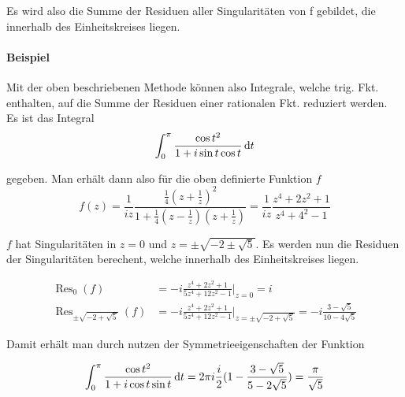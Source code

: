 Es wird also die Summe der Residuen aller Singularitäten von f gebildet, die innerhalb des Einheitskreises liegen.

\paragraph{Beispiel}
Mit der oben beschriebenen Methode können also Integrale, welche trig. Fkt. enthalten, auf die Summe der Residuen einer rationalen Fkt. reduziert werden.\\
Es ist das Integral 
\begin{equation*}
    \int_0^\pi \frac{\cos{t}^2}{1+i\sin{t}\cos{t}} \mathop{}\!\mathrm{d} t
\end{equation*}

\noindent gegeben. Man erhält dann also für die oben definierte Funktion $f$
\begin{equation*}
    f(z)=\frac{1}{iz}\frac{\frac{1}{4}(z+\frac{1}{z})^2}{1+\frac{1}{4}(z-\frac{1}{z})(z+\frac{1}{z})}
    =\frac{1}{iz}\frac{z^4+2z^2+1}{z^4+4^2-1}
\end{equation*}

$f$ hat Singularitäten in $z=0$ und $z=\pm \sqrt{-2\pm \sqrt{5}}$. Es werden nun die Residuen der Singularitäten berechent, welche innerhalb des Einheitskreises liegen.


\begin{align*}
    \operatorname{Res}_0(f)&=-i\frac{z^4+2z^2+1}{5z^4+12z^2-1}\big|_{z=0}=i\\
    \operatorname{Res}_{\pm \sqrt{-2+\sqrt{5}}}(f)&=-i\frac{z^4+2z^2+1}{5z^4+12z^2-1}\big|_{z=\pm \sqrt{-2+\sqrt{5}}}=-i\frac{3-\sqrt{5}}{10-4\sqrt{5}}
\end{align*}


Damit erhält man durch nutzen der Symmetrieeigenschaften der Funktion

\begin{align*}
    \int_0^\pi\frac{\cos{t}^2}{1+i\cos{t}\sin{t}}\mathop{}\!\mathrm{d} t = 2\pi i\frac{i}{2}(1-\frac{3-\sqrt{5}}{5-2\sqrt{5}})=\frac{\pi}{\sqrt{5}}
\end{align*}
